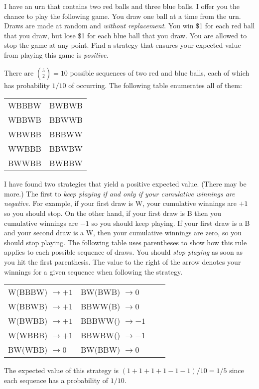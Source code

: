 \documentclass[addpoints,12pt]{exam}\usepackage[]{graphicx}\usepackage[]{color}
\begin{document}
\begin{questions}
  \question I have an urn that contains two red balls and three blue balls.
  I offer you the chance to play the following game. You draw one ball at a time from the urn. Draws are made at random and \emph{without replacement}. You win \$1 for each red ball that you draw, but lose \$1 for each blue ball that you draw. You are allowed to stop the game at any point. Find a strategy that ensures your expected value from playing this game is \emph{positive}. 
  \begin{solution}
    There are ${5 \choose 2} = 10$ possible sequences of two red and blue balls, each of which has probability $1/10$ of occurring. 
    The following table enumerates all of them:
    \begin{center}
    \begin{tabular}[h]{ll}
      WBBBW & BWBWB\\
      WBBWB & BBWWB\\
      WBWBB & BBBWW\\
      WWBBB & BBWBW\\
      BWWBB & BWBBW
    \end{tabular}
  \end{center}
  I have found two strategies that yield a positive expected value.
  (There may be more.)
  The first to \emph{keep playing if and only if your cumulative winnings are negative}.
  For example, if your first draw is W, your cumulative winnings are $+1$ so you should stop.
  On the other hand, if your first draw is B then you cumulative winnings are $-1$ so you should keep playing. 
  If your first draw is a B and your second draw is a W, then your cumulative winnings are zero, so you should stop playing.
  The following table uses parentheses to show how this rule applies to each possible sequence of draws.
  You should \emph{stop playing} as soon as you hit the first parenthesis.
  The value to the right of the arrow denotes your winnings for a given sequence when following the strategy.
  \begin{center}
    \begin{tabular}[h]{llll}
      W(BBBW) $\rightarrow +1$& BW(BWB) $\rightarrow 0$\\
      W(BBWB) $\rightarrow +1$& BBWW(B) $\rightarrow 0$\\
      W(BWBB) $\rightarrow +1$& BBBWW() $\rightarrow -1$\\
      W(WBBB) $\rightarrow +1$& BBWBW() $\rightarrow -1$\\
      BW(WBB) $\rightarrow 0$& BW(BBW) $\rightarrow 0$
    \end{tabular}
  \end{center}
  The expected value of this strategy is $(1 + 1 + 1 + 1 - 1 - 1)/10 = 1/5$ since each sequence has a probability of $1/10$.


\end{solution}
\end{questions}
\end{document}
